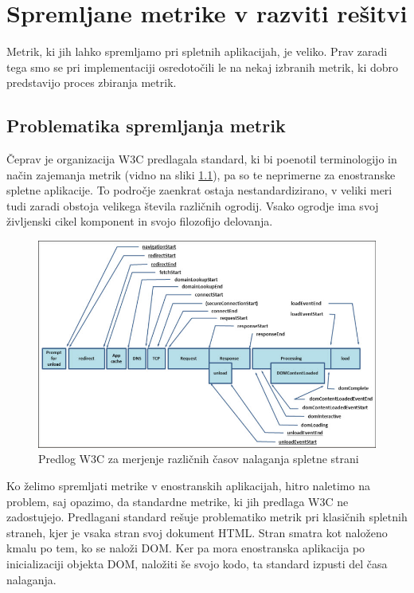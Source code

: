 \documentclass[a4paper, 12pt]{book}
\begin{document}
\chapter{Spremljane metrike v razviti rešitvi}
\label{ch2}

Metrik, ki jih lahko spremljamo pri spletnih aplikacijah, je veliko. Prav zaradi tega smo se pri implementaciji osredotočili le na nekaj izbranih metrik, ki dobro predstavijo proces zbiranja metrik.

\section{Problematika spremljanja metrik}

Čeprav je organizacija W3C predlagala standard, ki bi poenotil terminologijo in način zajemanja metrik (vidno na sliki \ref{img:w3c_metrics}), pa so te neprimerne za enostranske spletne aplikacije. To področje zaenkrat ostaja nestandardizirano, v veliki meri tudi zaradi obstoja velikega števila različnih ogrodij. Vsako ogrodje ima svoj življenski cikel komponent in svojo filozofijo delovanja.

\begin{figure}[h]
	\begin{center}
		\includegraphics[width=1\textwidth]{w3c-metrics.jpg}
	\end{center}
	\caption{Predlog W3C za merjenje različnih časov nalaganja spletne strani}
	\label{img:w3c_metrics}
\end{figure}

Ko želimo spremljati metrike v enostranskih aplikacijah, hitro naletimo na problem, saj opazimo, da standardne metrike, ki jih predlaga W3C ne zadostujejo. Predlagani standard rešuje problematiko metrik pri klasičnih spletnih straneh, kjer je vsaka stran svoj dokument HTML. Stran smatra kot naloženo kmalu po tem, ko se naloži DOM. Ker pa mora enostranska aplikacija po inicializaciji objekta DOM, naložiti še svojo kodo, ta standard izpusti del časa nalaganja.
\end{document}
